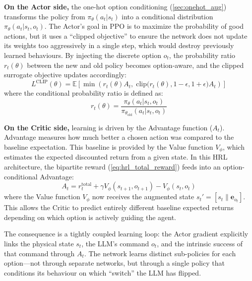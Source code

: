 \textbf{On the Actor side,} the one-hot option conditioning (\cref{sec:onehot_aug}) transforms the policy from $\pi_\theta(a_t \vert{} s_t)$ into a conditional distribution $\pi_\theta(a_t \vert{} s_t, o_t)$. 
The Actor's goal in PPO is to maximize the probability of good actions, but it uses a ``clipped objective'' to ensure the network does not update its weights too aggressively in a single step, which would destroy previously learned behaviours. 
By injecting the discrete option $o_t$, the probability ratio $r_t(\theta)$ between the new and old policy becomes option-aware, and the clipped surrogate objective updates accordingly:
\begin{equation}
    L^{\text{CLIP}}(\theta) = \mathbb{E} \left[ \min\left( r_t(\theta) A_t,\; \text{clip}\bigl(r_t(\theta), 1 - \epsilon, 1 + \epsilon\bigr) A_t \right) \right]
\end{equation}
where the conditional probability ratio is defined as:
\begin{equation}
    r_t(\theta) = \frac{\pi_\theta(a_t \vert{} s_t, o_t)}{\pi_{\theta_{\text{old}}}(a_t \vert{} s_t, o_t)}
\end{equation}

\textbf{On the Critic side,} learning is driven by the Advantage function ($A_t$). Advantage measures how much better a chosen action was compared to the baseline expectation. This baseline is provided by the Value function $V_\phi$, which estimates the expected discounted return from a given state.
In this HRL architecture, the bipartite reward (\cref{eq:hrl_total_reward}) feeds into an option-conditional Advantage:
\begin{equation}
    A_t = r_t^{\text{total}} + \gamma V_\phi(s_{t+1}, o_{t+1}) - V_\phi(s_t, o_t)
\end{equation}
where the Value function $V_\phi$ now receives the augmented state $s_t' = [s_t \parallel \mathbf{e}_{o_t}]$. This allows the Critic to predict entirely different baseline expected returns depending on which option is actively guiding the agent.

The consequence is a tightly coupled learning loop: the Actor gradient explicitly links the physical state $s_t$, the LLM's command $o_t$, and the intrinsic success of that command through $A_t$. The network learns distinct sub-policies for each option---not through separate networks, but through a single policy that conditions its behaviour on which ``switch'' the LLM has flipped.


